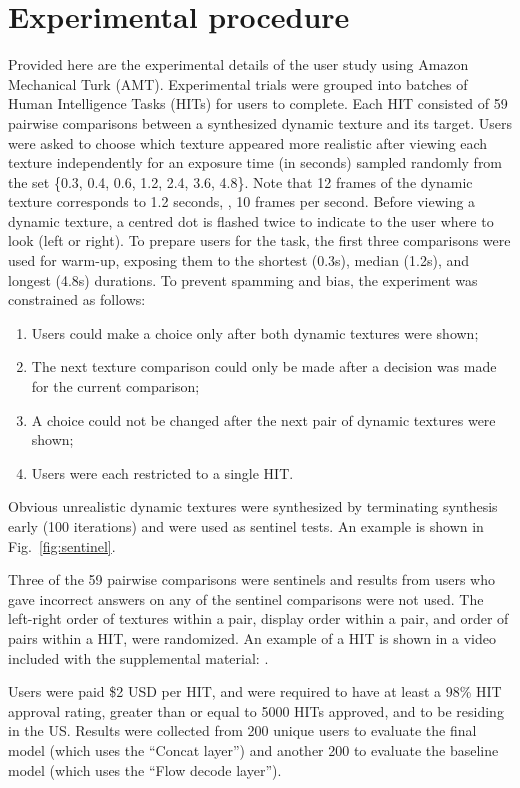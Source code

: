 \section{Experimental procedure}\label{sec:experimental_procedure}
Provided here are the experimental details of the user study
using Amazon Mechanical Turk (AMT). Experimental trials were
grouped into batches of Human Intelligence Tasks (HITs) for
users to complete. Each HIT consisted of 59 pairwise
comparisons between a synthesized dynamic texture and its target.
Users were asked to choose which texture appeared more realistic
after viewing each texture independently for an exposure time (in seconds) 
sampled randomly from the set \{0.3, 0.4, 0.6, 1.2, 2.4, 3.6, 4.8\}.
Note that 12 frames of the dynamic texture corresponds to 1.2 seconds, \ie, 10 frames per second.
Before viewing a dynamic texture, a centred dot is flashed twice to
indicate to the user where to look (left or right).
To prepare users for the task, the first three comparisons 
were used for warm-up, exposing them to the shortest (0.3s), 
median (1.2s), and longest (4.8s) durations.
To prevent spamming and bias, the experiment was constrained as 
follows:
\begin{enumerate}
	\item Users could make a choice only after both dynamic textures were shown;
	\item The next texture comparison could only be made after a decision was made for the current comparison;
	\item A choice could not be changed after the next pair of dynamic textures were shown;
	\item Users were each restricted to a single HIT.
\end{enumerate}
Obvious unrealistic dynamic textures were synthesized by 
terminating synthesis early (100 iterations) and were used as sentinel tests. An example is shown in Fig.\ \ref{fig:sentinel}.



Three of the 59 pairwise comparisons were sentinels and results from
users who gave incorrect answers on any of the sentinel
comparisons were not used. The left-right order of textures within a pair,
display order within a pair, and order of pairs within a HIT, were randomized.
An example of a HIT is shown in a video included with the supplemental material: .

Users were paid \$2 USD per HIT, and were required to have at least
a 98\% HIT approval rating, greater than or equal to 5000 HITs
approved, and to be residing in the US. Results were collected from 200 unique 
users to evaluate the final model (which uses the ``Concat layer'') and another 200 to evaluate the baseline model (which uses the ``Flow decode layer'').